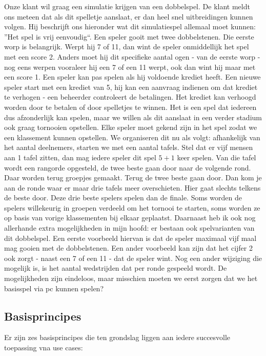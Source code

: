 \begin{example}
Onze klant wil graag een simulatie krijgen van een dobbelspel.  De klant meldt ons meteen dat als dit spelletje aanslaat, er dan heel snel uitbreidingen kunnen volgen. Hij beschrijft ons hieronder wat dit simulatiespel allemaal moet kunnen: ''Het spel is vrij eenvoudig``. Een speler gooit met twee dobbelstenen. Die eerste worp is belangrijk. Werpt hij 7 of 11, dan wint de speler onmiddellijk het spel met een score 2. Anders moet hij dit specifieke aantal ogen - van de eerste worp - nog eens werpen vooraleer hij een 7 of een 11 werpt, ook dan wint hij maar met een score 1. Een speler kan pas spelen als hij voldoende krediet heeft. Een nieuwe speler start met een krediet van 5, hij kan een aanvraag indienen om dat krediet te verhogen - een beheerder controleert de betalingen. Het krediet kan verhoogd worden door te betalen of door spelletjes te winnen. Het is een spel dat iedereen dus afzonderlijk kan spelen, maar we willen als dit aanslaat in een verder stadium ook graag tornooien opstellen.  Elke speler moet  gekend zijn in het spel zodat we een klassement kunnen opstellen. We organiseren dit nu als volgt: afhankelijk van het aantal deelnemers, starten we met een aantal tafels. Stel dat er vijf mensen aan 1 tafel zitten, dan mag iedere speler dit spel $5 + 1$ keer spelen. Van die tafel wordt een rangorde opgesteld, de twee beste gaan door naar de volgende rond. Daar worden terug groepjes gemaakt. Terug de twee beste gaan door.  Dan kom je aan de ronde waar er maar drie tafels meer overschieten.  Hier gaat slechts telkens de beste door. Deze drie beste spelers spelen dan de finale. Soms worden de spelers willekeurig in groepen verdeeld om het tornooi te starten, soms worden ze op basis van vorige klassementen bij elkaar geplaatst. Daarnaast heb ik ook nog allerhande extra mogelijkheden in mijn hoofd: er bestaan ook spelvarianten van dit dobbelspel. Een eerste voorbeeld hiervan is dat de speler maximaal vijf maal mag gooien met de dobbelstenen.  Een ander voorbeeld kan zijn dat het cijfer 2 ook zorgt - naast een 7 of een 11 - dat de speler wint.  Nog een ander wijziging die mogelijk is, is het aantal wedstrijden dat per ronde gespeeld wordt. De mogelijkheden zijn eindeloos, maar misschien moeten we eerst zorgen dat we het basisspel via pc kunnen spelen?
\end{example}

\subsection{Basisprincipes}
Er zijn zes basisprincipes die ten grondslag liggen aan iedere succesvolle toepassing vna use cases:

